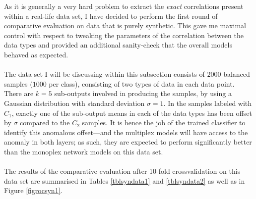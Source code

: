 \documentclass[12pt,a4paper,twoside,openright]{report}
\begin{document}
As it is generally a very hard problem to extract the \emph{exact} correlations present within a real-life data set, I have decided to perform the first round of comparative evaluation on data that is purely synthetic. This gave me maximal control with respect to tweaking the parameters of the correlation between the data types and provided an additional sanity-check that the overall models behaved as expected.\\ \\
The data set I will be discussing within this subsection consists of $2000$ balanced samples ($1000$ per class), consisting of two types of data in each data point. There are $k=5$ sub-outputs involved in producing the samples, by using a Gaussian distribution with standard deviation $\sigma = 1$. In the samples labeled with $C_1$, exactly one of the sub-output means in each of the data types has been offset by $\sigma$ compared to the $C_2$ samples. It is hence the job of the trained classifier to identify this anomalous offset---and the multiplex models will have access to the anomaly in both layers; as such, they are expected to perform significantly better than the monoplex network models on this data set.\\ \\
The results of the comparative evaluation after 10-fold crossvalidation on this data set are summarised in Tables \ref{tblsyndata1} and \ref{tblsyndata2} as well as in Figure \ref{figrocsyn1}.%
\end{document}
